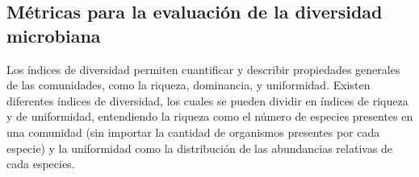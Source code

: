 








\subsection{Métricas para la evaluación de la diversidad microbiana}
Los índices de diversidad permiten cuantificar y describir propiedades generales de las comunidades, como la riqueza, dominancia, y uniformidad.  %
Existen diferentes índices de diversidad, los cuales se pueden dividir en índices de riqueza y de uniformidad, entendiendo la riqueza como el número de especies presentes en una comunidad (sin importar la cantidad de organismos presentes por cada especie) y la uniformidad como la distribución de las abundancias relativas de cada especies.

